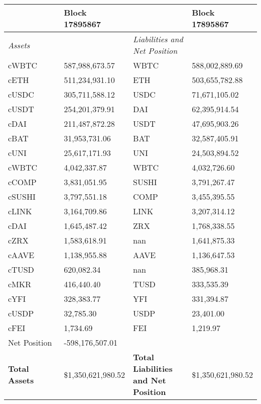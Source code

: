 
\begin{longtable}{@{}p{0.25\linewidth}p{0.25\linewidth}p{0.25\linewidth}p{0.25\linewidth}@{}}

\toprule


& Block 17895867 & & Block 17895867 \\

\midrule
\textit{Assets} & & \textit{Liabilities and Net Position} \\
cWBTC & 587,988,673.57 & WBTC &588,002,889.69 \\
cETH & 511,234,931.10 & ETH &503,655,782.88 \\
cUSDC & 305,711,588.12 & USDC &71,671,105.02 \\
cUSDT & 254,201,379.91 & DAI &62,395,914.54 \\
cDAI & 211,487,872.28 & USDT &47,695,903.26 \\
cBAT & 31,953,731.06 & BAT &32,587,405.91 \\
cUNI & 25,617,171.93 & UNI &24,503,894.52 \\
cWBTC & 4,042,337.87 & WBTC &4,032,726.60 \\
cCOMP & 3,831,051.95 & SUSHI &3,791,267.47 \\
cSUSHI & 3,797,551.18 & COMP &3,455,395.55 \\
cLINK & 3,164,709.86 & LINK &3,207,314.12 \\
cDAI & 1,645,487.42 & ZRX &1,768,338.55 \\
cZRX & 1,583,618.91 & nan &1,641,875.33 \\
cAAVE & 1,138,955.88 & AAVE &1,136,647.53 \\
cTUSD & 620,082.34 & nan &385,968.31 \\
cMKR & 416,440.40 & TUSD &333,535.39 \\
cYFI & 328,383.77 & YFI &331,394.87 \\
cUSDP & 32,785.30 & USDP &23,401.00 \\
cFEI & 1,734.69 & FEI &1,219.97 \\
Net Position & -598,176,507.01 & & \\

\midrule

\textbf{Total Assets} & \$1,350,621,980.52 & \textbf{Total Liabilities and Net Position} & \$1,350,621,980.52 \\

\bottomrule

\end{longtable}
